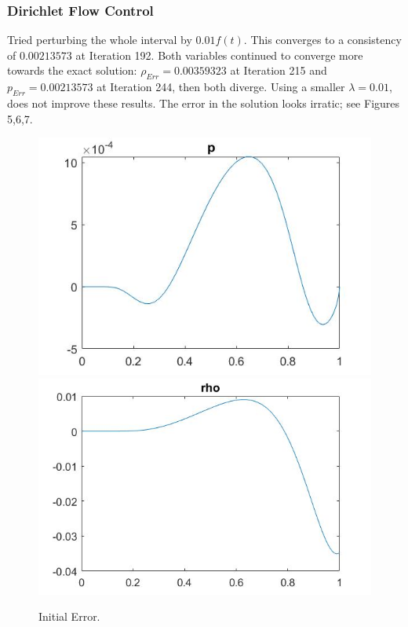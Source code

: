 \documentclass[11pt, a4paper]{article}
\theoremstyle{definition}
\begin{document}
\subsubsection*{Dirichlet Flow Control}
Tried perturbing the whole interval by $0.01f(t)$. This converges to a consistency of $0.00213573$ at Iteration 192. Both variables continued to converge more towards the exact solution: $\rho_{Err} = 0.00359323$ at Iteration 215 and $p_{Err} = 0.00213573$ at Iteration 244, then both diverge. Using a smaller $\lambda =0.01$, does not improve these results. The error in the solution looks irratic; see Figures 5,6,7.
\begin{figure}[h]
	\includegraphics[scale=0.5]{pD3.jpg}
	\includegraphics[scale=0.4]{rD3.jpg}
	\caption{Initial Error.}
\end{figure}
\end{document}
